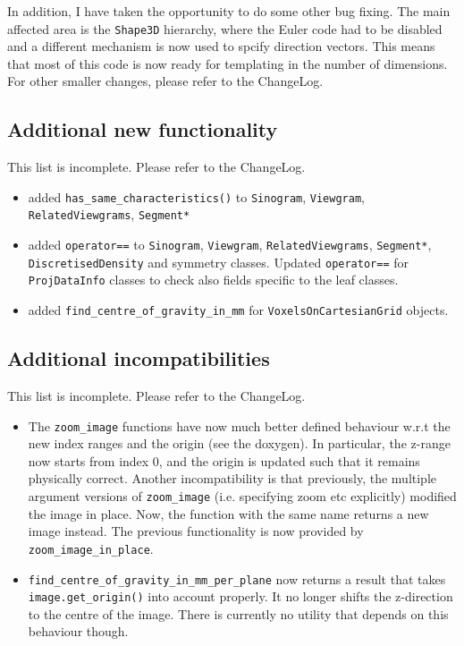 \documentclass{article}
\begin{document}
In addition, I have taken the opportunity to do some other bug fixing.
The main affected area is the \texttt{Shape3D} hierarchy, where the 
Euler code had to be disabled and a different mechanism is now used to
spcify direction vectors. This means that most of this code is now
ready for templating in the number of dimensions. For other smaller
changes, please refer to the ChangeLog.

\subsection{Additional new functionality}
This list is incomplete. Please refer to the ChangeLog.
\begin{itemize}
\item added \texttt{has\_same\_characteristics()} to \texttt{Sinogram}, \texttt{Viewgram}, 
       \texttt{RelatedViewgrams}, \texttt{Segment*}
\item added \texttt{operator==} to \texttt{Sinogram}, \texttt{Viewgram}, 
       \texttt{RelatedViewgrams}, \texttt{Segment*}, \texttt{DiscretisedDensity} 
       and symmetry classes. Updated \texttt{operator==} for \texttt{ProjDataInfo}
       classes to check also fields specific to the leaf classes.
\item added \texttt{find\_centre\_of\_gravity\_in\_mm} for \texttt{VoxelsOnCartesianGrid} objects.
\end{itemize}

\subsection{Additional incompatibilities}
This list is incomplete. Please refer to the ChangeLog.
\begin{itemize}
\item The \texttt{zoom\_image} functions have now much better defined behaviour
	w.r.t the new index ranges and the origin (see the doxygen). In particular,
	the z-range now starts from index 0, and the origin is updated such that
	it remains physically correct. Another incompatibility is that previously, 
	the multiple argument versions of \texttt{zoom\_image} (i.e. specifying zoom etc 
	explicitly) modified the image in place. Now, the function with the same name 
	returns a new image instead. The previous functionality is now provided by 
	\texttt{zoom\_image\_in\_place}.

\item \texttt{find\_centre\_of\_gravity\_in\_mm\_per\_plane} now returns a result that takes 
    \texttt{image.get\_origin()} into account properly. It no longer
    shifts the z-direction to the centre of the image. There is currently no
    utility that depends on this behaviour though.
\end{itemize}
\end{document}
